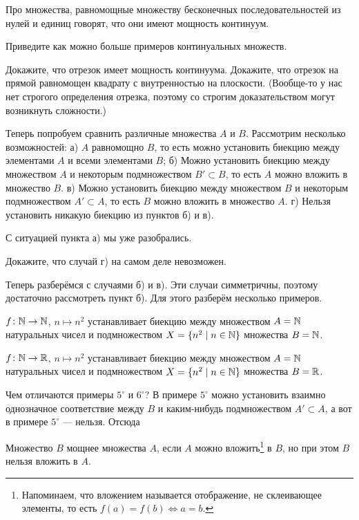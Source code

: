 \documentclass[a4paper,12pt]{article}
\begin{document}
Про множества, равномощные множеству бесконечных последовательностей из нулей и единиц говорят, что они имеют мощность  континуум.

Приведите как можно больше примеров континуальных множеств.

Докажите, что отрезок имеет мощность континуума. Докажите, что отрезок на прямой равномощен квадрату с внутренностью на плоскости.
(Вообще-то у нас нет строгого определения отрезка, поэтому со строгим доказательством могут возникнуть сложности.)

\newpage


Теперь попробуем сравнить различные множества $A$ и $B$. Рассмотрим несколько возможностей:
а) $A$ равномощно $B$, то есть можно установить биекцию между элементами $A$ и всеми элементами $B$;
б) Можно установить биекцию между множеством $A$ и некоторым подмножеством $B'\subset B$, то есть $A$ можно вложить в множество $B$.
в) Можно установить биекцию между множеством $B$ и некоторым подмножеством $A'\subset A$, то есть $B$ можно вложить в множество $A$.
г) Нельзя установить никакую биекцию из пунктов б) и в).

С ситуацией пункта а) мы уже разобрались.

Докажите, что случай г) на самом деле невозможен.

Теперь разберёмся с случаями б) и в). Эти случаи симметричны, поэтому достаточно рассмотреть пункт б). Для этого разберём несколько примеров.


$f\colon \mathbb{N} \rightarrow \mathbb{N}$, $n \mapsto n^2$ устанавливает биекцию между множеством $A=\mathbb{N}$ натуральных чисел и
подмножеством $X=\{n^2 \mid n\in\mathbb{N}\}$ множества $B=\mathbb{N}$.


$f\colon \mathbb{N} \rightarrow \mathbb{R}$, $n \mapsto n^2$ устанавливает биекцию между множеством $A=\mathbb{N}$ натуральных чисел и
подмножеством $X=\{n^2 \mid n\in\mathbb{N}\}$ множества $B=\mathbb{R}$.

Чем отличаются примеры $5^\circ$ и $6^\circ$? В примере $5^\circ$ можно установить взаимно однозначное соответствие между $B$ и каким-нибудь подмножеством $A'\subset A$, а вот в примере $5^\circ$ --- нельзя. Отсюда

Множество $B$  мощнее множества $A$, если $A$ можно вложить\footnote{Напоминаем, что  вложением называется отображение, не склеивающее элементы, то есть $f(a)=f(b)\Leftrightarrow a=b$.} в $B$, но при этом $B$ нельзя вложить в $A$.
\end{document}
